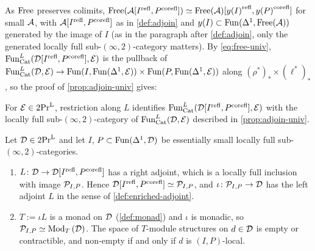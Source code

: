 %
As $\operatorname{Free}$ preserves colimits,
$\operatorname{Free}(\mathcal{A}[{I}^{\mathrm{refl}},{P}^{\mathrm{corefl}}]) \simeq \operatorname{Free}(\mathcal{A})[{y(I)}^{\mathrm{refl}},{y(P)}^{\mathrm{corefl}}]$
for small $\mathcal{A}$, with $\mathcal{A}[{I}^{\mathrm{refl}},{P}^{\mathrm{corefl}}]$ as in \cref{def:adjoin} and
$y(I) \subset \operatorname{Fun}(\Delta^{1},\operatorname{Free}(\mathcal{A}))$
generated by the image of $I$ (as in the paragraph after \cref{def:adjoin},
only the generated locally full sub-$(\infty,2)$-category matters).
By \eqref{eq:free-univ},
$\operatorname{Fun}^{L}_{\mathrm{Cat}}(\mathcal{D}[{I}^{\mathrm{refl}},{P}^{\mathrm{corefl}}],\mathcal{E})$
is the pullback of
$\operatorname{Fun}^{L}_{\mathrm{Cat}}(\mathcal{D},\mathcal{E}) \to \operatorname{Fun}(I,\operatorname{Fun}(\Delta^{1},\mathcal{E})) \times
\operatorname{Fun}(P,\operatorname{Fun}(\Delta^{1},\mathcal{E}))$
along
$(\rho^{*})_{*} \times (\ell^{*})_{*}$,
so the proof of \cref{prop:adjoin-univ} gives:

\begin{prop}
\label{prop:adjoin-univ-pres}
%
For $\mathcal{E} \in \operatorname{2Pr}^{\operatorname{L}}$, restriction along $L$ identifies
$\operatorname{Fun}^{L}_{\mathrm{Cat}}(\mathcal{D}[{I}^{\mathrm{refl}},{P}^{\mathrm{corefl}}],\mathcal{E})$
with the locally full sub-$(\infty,2)$-category of
$\operatorname{Fun}^{L}_{\mathrm{Cat}}(\mathcal{D},\mathcal{E})$
described in \cref{prop:adjoin-univ}.
\end{prop}

\begin{thm}
\label{thm:2dloc-local}
%
Let $\mathcal{D} \in \operatorname{2Pr}^{\operatorname{L}}$ and let $I$,
$P \subset \operatorname{Fun}(\Delta^{1},\mathcal{D})$
be essentially small locally full sub-$(\infty,2)$-categories.
\begin{enumerate}
\item
$L\colon \mathcal{D} \to \mathcal{D}[{I}^{\mathrm{refl}},{P}^{\mathrm{corefl}}]$
has a right adjoint, which is a locally full inclusion with image $\mathcal{P}_{I,P}$.
Hence
$\mathcal{D}[{I}^{\mathrm{refl}},{P}^{\mathrm{corefl}}] \simeq \mathcal{P}_{I,P}$,
and
$\iota\colon \mathcal{P}_{I,P} \to \mathcal{D}$
has the left adjoint $L$ in the sense of \cref{def:enriched-adjoint}.
\item $T := \iota L$ is a monad on $\mathcal{D}$ (\cref{def:monad}) and $\iota$ is
monadic, so
$\mathcal{P}_{I,P} \simeq {\operatorname{Mod}_{T}\left(\mathcal{D}\right)}$.
The space of $T$-module structures on $d \in \mathcal{D}$ is empty or contractible,
and non-empty if and only if $d$ is $(I,P)$-local.
\end{enumerate}
\end{thm}

